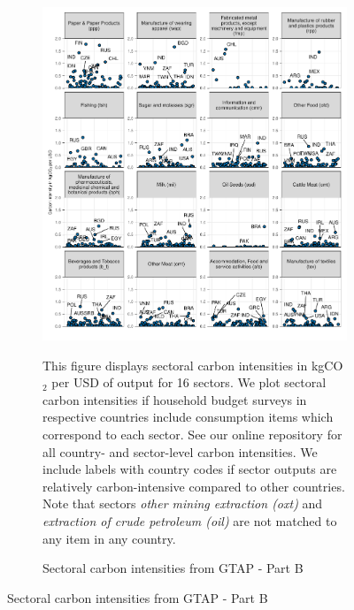 \begin{figure}[ht!]\ContinuedFloat
\begin{subfigure}[b]{\textwidth}
  \centering
  \caption{Sectoral carbon intensities from GTAP - Part B} \label{fig:B2}  \includegraphics{Analysis_Carbon_Intensities_GTAP/Figure_2.1.1_B_2017B}
  \begin{subcaption2}
    This figure displays sectoral carbon intensities in kgCO$_{2}$ per USD of output for 16 sectors. We plot sectoral carbon intensities if household budget surveys in respective countries include consumption items which correspond to each sector. See our online repository for all country- and sector-level carbon intensities. We include labels with country codes if sector outputs are relatively carbon-intensive compared to other countries. Note that sectors \textit{other mining extraction (oxt)} and \textit{extraction of crude petroleum (oil)} are not matched to any item in any country.
  \end{subcaption2}
\end{subfigure}
\end{figure}

\clearpage


